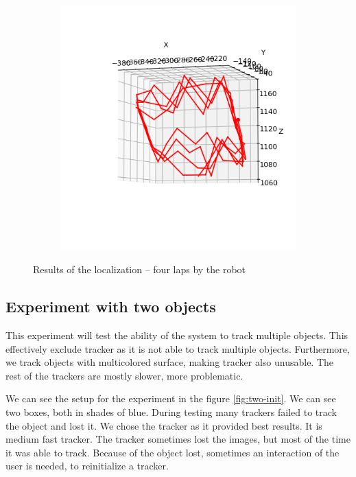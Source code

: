 \begin{figure}
\begin{subfigure}{0.48\linewidth}
	\includegraphics[width=\linewidth]{img/experiments/square-ugly.png}
\end{subfigure}
\caption{Results of the localization -- four laps by the robot}
\label{fig:square-results}
\end{figure}

\subsection{Experiment with two objects}

This experiment will test the ability of the system to track multiple objects.
This effectively exclude \simback{} tracker as it is not able to track multiple
objects. Furthermore, we track objects with multicolored surface, making \hsv
tracker also unusable. The rest of the trackers are mostly slower, more
problematic.

We can see the setup for the experiment in the figure \ref{fig:two-init}. We
can see two boxes, both in shades of blue. During testing many trackers failed
to track the object and lost it. We chose the \corr{} tracker as it provided
best results. It is medium fast tracker. The tracker sometimes lost the
images, but most of the time it was able to track. Because of the object lost,
sometimes an interaction of the user is needed, to reinitialize a tracker.

